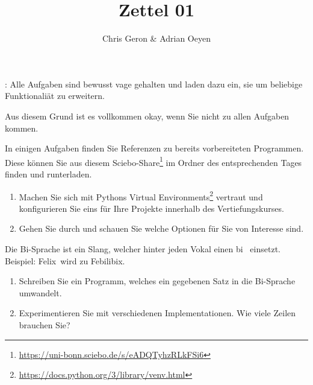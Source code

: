 \documentclass{ubo_tex_uebungszettel/uebungszettel}
\title{Zettel 01}
\author{Chris Geron \& Adrian Oeyen}
\theoremstyle{definition}
\newcommand{\pp}[1]{\lpl{#1}}
\newcommand{\furl}[1]{\footnote{\url{#1}}}
\begin{document}
\maketitle

\noindent {}: \quad
Alle Aufgaben sind bewusst vage gehalten und laden dazu ein, sie um beliebige Funktionaliät zu erweitern.

\noindent Aus diesem Grund ist es vollkommen okay, wenn Sie nicht zu allen Aufgaben kommen.

\noindent In einigen Aufgaben finden Sie Referenzen zu bereits vorbereiteten Programmen. Diese können Sie aus diesem Sciebo-Share\furl{https://uni-bonn.sciebo.de/s/eADQTyhzRLkFSi6} im Ordner des entsprechenden Tages finden und runterladen.

\medskip


\noindent {} \quad

    \begin{enumerate}
        \item Machen Sie sich mit Pythons Virtual Environments\furl{https://docs.python.org/3/library/venv.html} vertraut und konfigurieren Sie eins für Ihre Projekte innerhalb des Vertiefungskurses.
        \item Gehen Sie \pp{pycharm-cheatsheet.pdf} durch und schauen Sie welche Optionen für Sie von Interesse sind.
    \end{enumerate}

\medskip
\medskip

\noindent {} \quad

    \noindent Die Bi-Sprache ist ein Slang, welcher hinter jeden Vokal einen \glqq bi\grqq~ einsetzt.\\
    Beispiel: \glqq Felix\grqq~wird zu \glqq Febilibix\grqq.
    \begin{enumerate}
        \item Schreiben Sie ein Programm, welches ein gegebenen Satz in die Bi-Sprache umwandelt.
        \item Experimentieren Sie mit verschiedenen Implementationen. Wie viele Zeilen brauchen Sie?
    \end{enumerate}
\medskip
\medskip

\pagebreak

\noindent {} \quad
\end{document}
